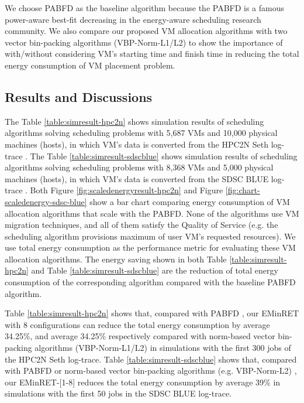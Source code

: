 We choose PABFD \cite{Beloglazov2011} as the baseline algorithm 
because the PABFD is a famous power-aware best-fit decreasing
in the energy-aware scheduling research community.
We also compare our proposed VM 
allocation algorithms with two vector bin-packing algorithms (VBP-Norm-L1/L2) to show 
the importance of with/without considering VM's starting time and finish time 
in reducing the total energy consumption of VM placement problem.




\subsection{Results and Discussions}
\label{sec:resultsanddiscussions}

The Table \ref{table:simresult-hpc2n} shows simulation results of scheduling algorithms solving scheduling problems 
 with 5,687 VMs and 10,000 physical machines (hosts),
 in which VM's data is converted from the HPC2N Seth log-trace \cite{HPC2NWorkload}.
 The Table \ref{table:simresult-sdscblue} shows simulation results of scheduling algorithms solving scheduling problems 
  with 8,368 VMs and 5,000 physical machines (hosts),
  in which VM's data is converted from the SDSC BLUE log-trace \cite{SDSCBLUEWorkload}.
Both Figure \ref{fig:scaledenergyresult-hpc2n} and Figure \ref{fig:chart-scaledenergy-sdsc-blue} show a bar chart comparing energy consumption of VM allocation algorithms that scale with the PABFD.
None of the algorithms use VM migration techniques,
and all of them  satisfy the Quality of Service
(e.g. the scheduling algorithm provisions maximum of user VM's requested resources).
We use total energy consumption as the performance metric for
evaluating these VM allocation algorithms.
The energy saving shown in both Table \ref{table:simresult-hpc2n} and Table \ref{table:simresult-sdscblue} are the reduction of
total energy consumption of the corresponding algorithm
compared with the baseline PABFD  \cite{Beloglazov2011} algorithm.

Table \ref{table:simresult-hpc2n} shows that, compared with PABFD \cite{Beloglazov2011},
 our EMinRET with 8 configurations
 can reduce the total energy consumption by average 34.25\%, and
 average 34.25\% respectively compared with
 norm-based vector bin-packing algorithms
 (VBP-Norm-L1/L2) in simulations with the first 300 jobs of the HPC2N Seth log-trace. 
 Table \ref{table:simresult-sdscblue} shows that, compared with PABFD \cite{Beloglazov2011} 
 or norm-based vector bin-packing algorithms (e.g. VBP-Norm-L2) \cite{Panigrahy2011},
 our EMinRET-[1-8]
 reduces the total energy consumption by average 39\%
 in simulations with the first 50 jobs in the SDSC BLUE log-trace.



